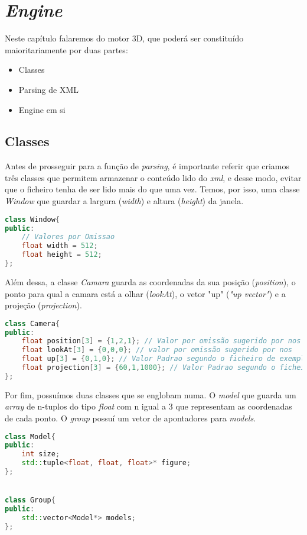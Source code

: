 \documentclass[14pt, a4 paper]{report}
\begin{document}
\chapter{\textit{Engine}} \label{chap:engine}
Neste capítulo falaremos do motor 3D, que poderá ser constituído maioritariamente por duas partes:
\begin{itemize}
    \item Classes
    \item Parsing de XML
    \item Engine em si
\end{itemize}
\section{Classes}
Antes de prosseguir para a função de \textit{parsing}, é importante referir que criamos três classes que permitem armazenar o conteúdo lido do \textit{xml}, e desse modo, evitar que o ficheiro tenha de ser lido mais do que uma vez.
Temos, por isso, uma classe \textit{Window} que guardar a largura (\textit{width}) e altura (\textit{height}) da janela.
\begin{lstlisting}[language = c++]
class Window{
public:
    // Valores por Omissao
    float width = 512;
    float height = 512; 
};
\end{lstlisting}
Além dessa, a classe \textit{Camara} guarda as coordenadas da sua posição (\textit{position}), o ponto para qual a camara está a olhar (\textit{lookAt}), o vetor "up" (\textit{"up vector"}) e a projeção (\textit{projection}).
\begin{lstlisting}[language = c++]
class Camera{
public:
    float position[3] = {1,2,1}; // Valor por omissão sugerido por nos
    float lookAt[3] = {0,0,0}; // valor por omissão sugerido por nos
    float up[3] = {0,1,0}; // Valor Padrao segundo o ficheiro de exemplo
    float projection[3] = {60,1,1000}; // Valor Padrao segundo o ficheiro de exemplo
};
\end{lstlisting}

Por fim, possuímos duas classes que se englobam numa. O \textit{model} que guarda um \textit{array} de n-tuplos do tipo \textit{float} com n igual a 3 que representam as coordenadas de cada ponto. O \textit{group} possuí um vetor de apontadores para \textit{models}.
\begin{lstlisting}[language = c++]
class Model{
public:
    int size;
    std::tuple<float, float, float>* figure;
};


class Group{
public:
    std::vector<Model*> models;
};
\end{lstlisting}
\end{document}
